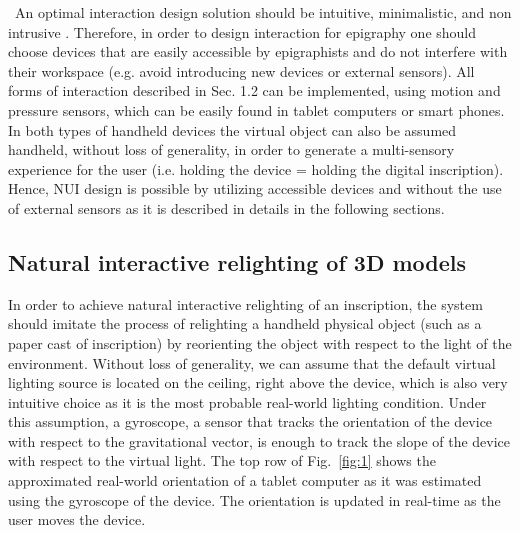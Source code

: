 \documentclass[amsthm,ebook]{saparticle}
\begin{document}
\ An optimal interaction design solution should be intuitive, minimalistic, and non intrusive \citep{preece_interaction_2015}.
Therefore, in order to design interaction for epigraphy one should choose devices that are easily accessible by
epigraphists and do not interfere with their workspace (e.g. avoid introducing new devices or external sensors). All
forms of interaction described in Sec. 1.2 can be implemented, using motion and pressure sensors, which can be easily
found in tablet computers or smart phones. In both types of handheld devices the virtual object can also be assumed
handheld, without loss of generality, in order to generate a multi-sensory experience for the user (i.e. holding the
device = holding the digital inscription). Hence, NUI design is possible by utilizing accessible devices and
without the use of external sensors as it is described in details in the following sections.


\subsection{Natural interactive relighting of 3D models}


In order to achieve natural interactive relighting of an inscription, the system should imitate the process of
relighting a handheld physical object (such as a paper cast of inscription) by reorienting the object with respect to
the light of the environment. Without loss of generality, we can assume that the default virtual lighting source is
located on the ceiling, right above the device, which is also very intuitive choice as it is the most probable
real-world lighting condition. Under this assumption, a gyroscope, a sensor that tracks the orientation of the device
with respect to the gravitational vector, is enough to track the slope of the device with respect to the virtual light.
The top row of Fig.~\ref{fig:1} shows the approximated real-world orientation of a tablet computer as it was estimated using
the gyroscope of the device. The orientation is updated in real-time as the user moves the device.
\end{document}
